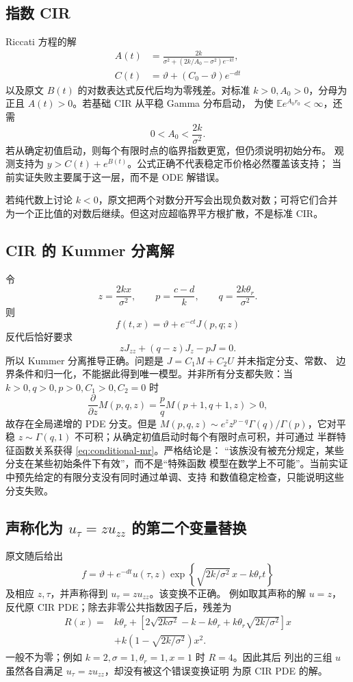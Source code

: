 \documentclass[UTF8,11pt]{ctexart}
\newcommand{\E}{\mathbb E}
\begin{document}
\subsection{指数 CIR}

Riccati 方程的解
\begin{align*}
 A(t)&=\frac{2k}{\sigma^2+(2k/A_0-\sigma^2)e^{-kt}},\\
 C(t)&=\vartheta+(C_0-\vartheta)e^{-dt}
\end{align*}
以及原文 $B(t)$ 的对数表达式反代后均为零残差。对标准
$k>0,A_0>0$，分母为正且 $A(t)>0$。若基础 CIR 从平稳 Gamma 分布启动，
为使 $\E e^{A_0r_0}<\infty$，还需
\begin{equation}
 0<A_0<\frac{2k}{\sigma^2}.
 \label{eq:cir-exp-integrability}
\end{equation}
若从确定初值启动，则每个有限时点的临界指数更宽，但仍须说明初始分布。
观测支持为 $y>C(t)+e^{B(t)}$。公式正确不代表稳定币价格必然覆盖该支持；
当前实证失败主要属于这一层，而不是 ODE 解错误。

若纯代数上讨论 $k<0$，原文把两个对数分开写会出现负数对数；可将它们合并
为一个正比值的对数后继续。但这对应超临界平方根扩散，不是标准 CIR。

\subsection{CIR 的 Kummer 分离解}

令
\[
 z=\frac{2kx}{\sigma^2},\qquad
 p=\frac{c-d}{k},\qquad q=\frac{2k\theta_r}{\sigma^2}.
\]
则
\[
 f(t,x)=\vartheta+e^{-ct}J(p,q;z)
\]
反代后恰好要求
\[
 zJ_{zz}+(q-z)J_z-pJ=0.
\]
所以 Kummer 分离推导正确。问题是 $J=C_1M+C_2U$ 并未指定分支、常数、
边界条件和归一化，不能据此得到唯一模型。并非所有分支都失败：当
$k>0,q>0,p>0,C_1>0,C_2=0$ 时
\[
 \frac{\partial}{\partial z}M(p,q,z)
 =\frac pq M(p+1,q+1,z)>0,
\]
故存在全局递增的 PDE 分支。但是
$M(p,q,z)\sim e^zz^{p-q}\Gamma(q)/\Gamma(p)$，它对平稳
$z\sim\Gamma(q,1)$ 不可积；从确定初值启动时每个有限时点可积，并可通过
半群特征函数关系获得 \eqref{eq:conditional-mr}。严格结论是：
“该族没有被充分规定，某些分支在某些初始条件下有效”，而不是“特殊函数
模型在数学上不可能”。当前实证中预先给定的有限分支没有同时通过单调、支持
和数值稳定检查，只能说明这些分支失败。

\subsection{声称化为 $u_\tau=zu_{zz}$ 的第二个变量替换}

原文随后给出
\[
 f=\vartheta+e^{-dt}u(\tau,z)
 \exp\!\left\{\sqrt{2k/\sigma^2}\,x-k\theta_r t\right\}
\]
及相应 $z,\tau$，并声称得到 $u_\tau=zu_{zz}$。该变换不正确。
例如取其声称的解 $u=z$，反代原 CIR PDE；除去非零公共指数因子后，残差为
\begin{align*}
 R(x)={}&k\theta_r+
 \left[2\sqrt{2k\sigma^2}-k-k\theta_r
 +k\theta_r\sqrt{2k/\sigma^2}\right]x\\
 &+k\left(1-\sqrt{2k/\sigma^2}\right)x^2.
\end{align*}
一般不为零；例如 $k=2,\sigma=1,\theta_r=1,x=1$ 时 $R=4$。因此其后
列出的三组 $u$ 虽然各自满足 $u_\tau=zu_{zz}$，却没有被这个错误变换证明
为原 CIR PDE 的解。
\end{document}
